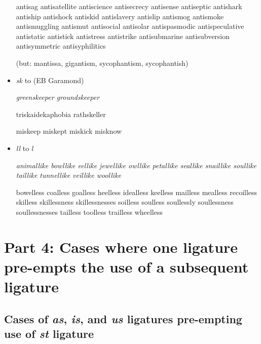 \begin{itemize}
\bgroup \em

antisag antisatellite antiscience antisecrecy antisense antiseptic antishark antiship antishock antiskid antislavery antislip antismog antismoke antismuggling antismut antisocial antisolar antispasmodic antispeculative antistatic antistick antistress antistrike antisubmarine antisubversion antisymmetric antisyphilitics 

(but: mantissa, gigantism, sycophantism, sycophantish)

\egroup

\item {\ebg\emph{sk}} to {} (EB Garamond)

\bgroup \ebg \em
greenskeeper groundskeeper 

triskaidekaphobia rathskeller

miskeep miskept miskick misknow

\egroup



\item \emph{ll} to \emph{l\hspace{0pt}}

\bgroup \em
animallike bowllike eellike jewellike owllike petallike seallike snaillike soullike taillike tunnellike veillike woollike

bowelless coalless goalless heelless idealless keelless mailless mealless recoilless skilless skillessness skillessnesses soilless soulless soullessly soullessness soullessnesses tailless toolless trailless wheelless

\egroup
\end{itemize}



\section*{Part 4: Cases where one ligature pre-empts the use of a subsequent ligature}

\subsection*{Cases of \emph{as}, \emph{is}, and \emph{us} ligatures pre-empting use of \emph{st} ligature}

\bgroup \em

